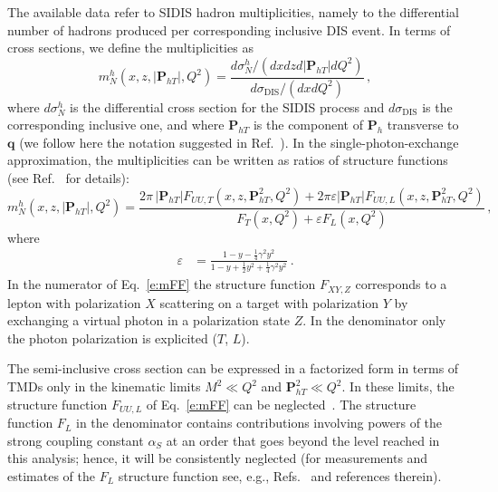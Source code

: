\documentclass[aps,preprintnumbers,showpacs,nofootinbib,superscriptaddress,floatfix]{revtex4}
\newcommand{\Tperp}{T}
\begin{document}
The available data refer to SIDIS hadron multiplicities, namely to the differential number of hadrons produced per corresponding inclusive DIS event. In terms of cross sections, we define the multiplicities as
\begin{equation}
m_N^h (x,z,|\bm{P}_{h\Tperp}|, Q^2) = \frac{d \sigma_N^h / ( dx  dz d|\bm{P}_{h\Tperp}| dQ^2) }
                                                                   {d\sigma_{\text{DIS}} / ( dx dQ^2 ) }\, ,
\label{e:multiplicity}
\end{equation}
where $d\sigma_N^h$ is the differential cross section for the SIDIS process and $d\sigma_{\text{DIS}}$ is the corresponding inclusive one, 
and where \( \bm{P}_{h\Tperp} \) is the component of \( \bm{P}_{h} \)
transverse to \( \bm{q} \) (we follow here the notation suggested in
Ref.~\cite{Boer:2011fh}).  
In the single-photon-exchange approximation, the multiplicities can be written
as ratios of 
structure functions (see Ref.~\cite{Bacchetta:2006tn} for details):
\begin{equation}
m_N^h (x,z,|\bm{P}_{h\Tperp}|, Q^2) =   
\frac{2 \pi\,|\bm{P}_{h\Tperp}| F_{UU ,T}(x,z,\bm{P}_{h\Tperp}^2, Q^2) + 2 \pi
  \varepsilon |\bm{P}_{h\Tperp}| F_{UU ,L}(x,z,\bm{P}_{h\Tperp}^2, Q^2)}
        {F_{T}(x,Q^2) + \varepsilon  F_{L}(x,Q^2)} \, ,
 \label{e:mFF}
\end{equation} 
where
\begin{align}
\varepsilon &= \frac{1-y -\frac{1}{4} \gamma^2 y^2}{1-y+\frac{1}{2} y^2 +\frac{1}{4} \gamma^2 y^2} \ .
\end{align}  
In the numerator of Eq.~\eqref{e:mFF} the structure function $F_{XY,Z}$ corresponds to a lepton with polarization $X$ scattering on a target with polarization $Y$ by exchanging a virtual photon in a polarization state $Z$. 
In the denominator only the photon polarization is explicited ($T$, $L$).

The semi-inclusive cross section can be expressed in a factorized form in
terms of TMDs only in the kinematic limits $M^2 \ll Q^2$ and 
$\bm{P}_{hT}^2 \ll Q^2$. 
In these limits, the structure function $F_{UU,L}$ of Eq.~\eqref{e:mFF}
can be neglected~\cite{Bacchetta:2008xw}. 
 The structure function $F_L$ in the denominator contains contributions
 involving powers of the strong coupling constant $\alpha_S$ at an order that
 goes beyond the level reached in this analysis; 
hence, it will be
 consistently neglected (for measurements and
 estimates of the $F_L$ structure function see, e.g.,
 Refs.~\cite{Chekanov:2009na,Andreev:2013vha} and references therein).  
\end{document}
